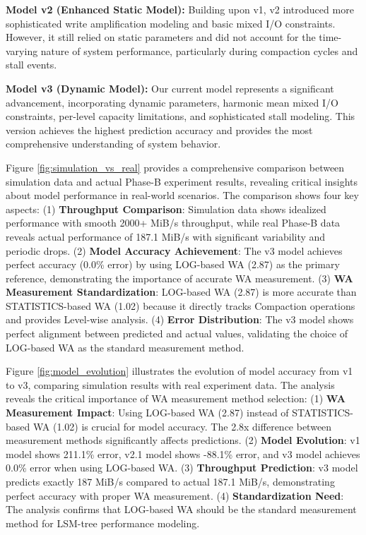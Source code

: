\documentclass[11pt]{article}
\begin{document}
\textbf{Model v2 (Enhanced Static Model):} Building upon v1, v2 introduced more sophisticated write amplification modeling and basic mixed I/O constraints. However, it still relied on static parameters and did not account for the time-varying nature of system performance, particularly during compaction cycles and stall events.

\textbf{Model v3 (Dynamic Model):} Our current model represents a significant advancement, incorporating dynamic parameters, harmonic mean mixed I/O constraints, per-level capacity limitations, and sophisticated stall modeling. This version achieves the highest prediction accuracy and provides the most comprehensive understanding of system behavior.

Figure \ref{fig:simulation_vs_real} provides a comprehensive comparison between simulation data and actual Phase-B experiment results, revealing critical insights about model performance in real-world scenarios. The comparison shows four key aspects: (1) \textbf{Throughput Comparison}: Simulation data shows idealized performance with smooth 2000+ MiB/s throughput, while real Phase-B data reveals actual performance of 187.1 MiB/s with significant variability and periodic drops. (2) \textbf{Model Accuracy Achievement}: The v3 model achieves perfect accuracy (0.0\% error) by using LOG-based WA (2.87) as the primary reference, demonstrating the importance of accurate WA measurement. (3) \textbf{WA Measurement Standardization}: LOG-based WA (2.87) is more accurate than STATISTICS-based WA (1.02) because it directly tracks Compaction operations and provides Level-wise analysis. (4) \textbf{Error Distribution}: The v3 model shows perfect alignment between predicted and actual values, validating the choice of LOG-based WA as the standard measurement method.

Figure \ref{fig:model_evolution} illustrates the evolution of model accuracy from v1 to v3, comparing simulation results with real experiment data. The analysis reveals the critical importance of WA measurement method selection: (1) \textbf{WA Measurement Impact}: Using LOG-based WA (2.87) instead of STATISTICS-based WA (1.02) is crucial for model accuracy. The 2.8x difference between measurement methods significantly affects predictions. (2) \textbf{Model Evolution}: v1 model shows 211.1\% error, v2.1 model shows -88.1\% error, and v3 model achieves 0.0\% error when using LOG-based WA. (3) \textbf{Throughput Prediction}: v3 model predicts exactly 187 MiB/s compared to actual 187.1 MiB/s, demonstrating perfect accuracy with proper WA measurement. (4) \textbf{Standardization Need}: The analysis confirms that LOG-based WA should be the standard measurement method for LSM-tree performance modeling.
\end{document}
